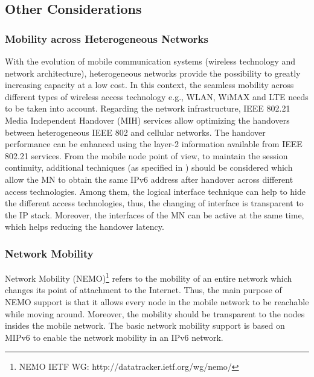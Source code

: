 \subsection{Other Considerations}
\subsubsection{Mobility across Heterogeneous Networks}
With the evolution of mobile communication systems (wireless technology and network architecture), heterogeneous networks provide the possibility to greatly increasing capacity at a low cost. In this context, the seamless mobility across different types of wireless access technology e.g., WLAN, WiMAX and LTE needs to be taken into account. Regarding the network infrastructure, IEEE 802.21 Media Independent Handover (MIH) services allow optimizing the handovers between heterogeneous IEEE 802 and cellular networks. The handover performance can be enhanced using the layer-2 information available from IEEE 802.21 services. From the mobile node point of view, to maintain the session continuity, additional techniques (as specified in \cite{PMIP_EV}) should be considered which allow the MN to obtain the same IPv6 address after handover across different access technologies. Among them, the logical interface technique \cite{logical_interface} can help to hide the different access technologies, thus, the changing of interface is transparent to the IP stack. Moreover, the interfaces of the MN can be active at the same time, which helps reducing the handover latency. 

\subsubsection{Network Mobility}
Network Mobility (NEMO)\footnote{NEMO IETF WG: http://datatracker.ietf.org/wg/nemo/} refers to the mobility of an entire network which changes its point of attachment to the Internet. Thus, the main purpose of NEMO support is that it allows every node in the mobile network to be reachable while moving around. Moreover, the mobility should be transparent to the nodes insides the mobile network. The basic network mobility support is based on MIPv6 to enable the network mobility in an IPv6 network. 

